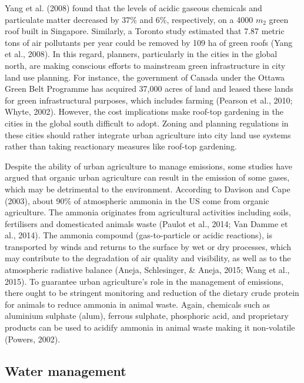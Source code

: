 Yang et al. (2008) found that the levels of acidic gaseous chemicals and particulate matter decreased by 37\% and 6\%, respectively, on a 4000 $m_{2}$ green roof built in Singapore. Similarly, a Toronto study estimated that 7.87 metric tons of air pollutants per year could be removed by 109 ha of green roofs (Yang et al., 2008). In this regard, planners, particularly in the cities in the global north, are making conscious efforts to mainstream green infrastructure in city land use planning. For instance, the government of Canada under the Ottawa Green Belt Programme has acquired 37,000 acres of land and leased these lands for green infrastructural purposes, which includes farming (Pearson et al., 2010; Whyte, 2002). However, the cost implications make roof-top gardening in the cities in the global south difficult to adopt. Zoning and planning regulations in these cities should rather integrate urban agriculture into city land use systems rather than taking reactionary measures like roof-top gardening.

Despite the ability of urban agriculture to manage emissions, some studies have argued that organic urban agriculture can result in the emission of some gases, which may be detrimental to the environment. According to Davison and Cape (2003), about 90\% of atmospheric ammonia in the US come from organic agriculture. The ammonia originates from agricultural activities including soils, fertilisers and domesticated animals waste (Paulot et al., 2014; Van Damme et al., 2014). The ammonia compound (gas-to-particle or acidic reactions), is transported by winds and returns to the surface by wet or dry processes, which may contribute to the degradation of air quality and visibility, as well as to the atmospheric radiative balance (Aneja, Schlesinger, \& Aneja, 2015; Wang et al., 2015). To guarantee urban agriculture's role in the management of emissions, there ought to be stringent monitoring and reduction of the dietary crude protein for animals to reduce ammonia in animal waste. Again, chemicals such as aluminium sulphate (alum), ferrous sulphate, phosphoric acid, and proprietary products can be used to acidify ammonia in animal waste making it non-volatile (Powers, 2002).

\subsection{Water management}

